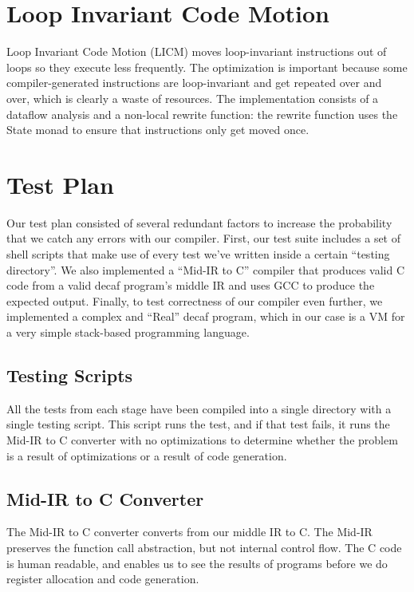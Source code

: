 \documentclass[11pt]{article}
\begin{document}

\section{Loop Invariant Code Motion}

Loop Invariant Code Motion (LICM) moves loop-invariant instructions
out of loops so they execute less frequently. The optimization is
important because some compiler-generated instructions are
loop-invariant and get repeated over and over, which is clearly a
waste of resources. The implementation consists of a dataflow analysis
and a non-local rewrite function: the rewrite function uses the State
monad to ensure that instructions only get moved once.

\section {Test Plan}
\label{sec:test}

Our test plan consisted of several redundant factors to increase the
probability that we catch any errors with our compiler. First, our
test suite includes a set of shell scripts that make use of every test
we've written inside a certain ``testing directory''. We also
implemented a ``Mid-IR to C'' compiler that produces valid C code from
a valid decaf program's middle IR and uses GCC to produce the expected
output. Finally, to test correctness of our compiler even further, we
implemented a complex and ``Real'' decaf program, which in our case is a
VM for a very simple stack-based programming language.

\subsection {Testing Scripts}

All the tests from each stage have been compiled into a single
directory with a single testing script. This script runs the test,
and if that test fails, it runs the Mid-IR to C converter with no
optimizations to determine whether the problem is a result of
optimizations or a result of code generation. 

\subsection {Mid-IR to C Converter} 

The Mid-IR to C converter converts from our middle IR to C. The Mid-IR
preserves the function call abstraction, but not internal control
flow. The C code is human readable, and enables us to see the results
of programs before we do register allocation and code generation.
\end{document}
